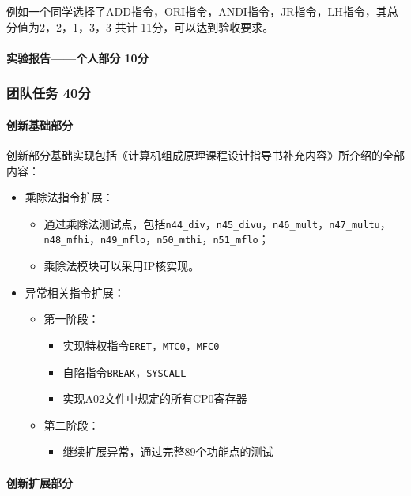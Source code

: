 例如一个同学选择了ADD指令，ORI指令，ANDI指令，JR指令，LH指令，其总分值为2，2，1，3，3 共计 11分，可以达到验收要求。

\paragraph{实验报告——个人部分 10分}

\subsubsection{团队任务 40分}

\paragraph{创新基础部分}

创新部分基础实现包括《计算机组成原理课程设计指导书补充内容》所介绍的全部内容：

\begin{itemize}
    \item 乘除法指令扩展：
    \begin{itemize}
        \item 通过乘除法测试点，包括\texttt{n44\_div}，\texttt{n45\_divu}，\texttt{n46\_mult}，\texttt{n47\_multu}，\texttt{n48\_mfhi}，\texttt{n49\_mflo}，\texttt{n50\_mthi}，\texttt{n51\_mflo}；
        \item 乘除法模块可以采用IP核实现。
    \end{itemize}
    \item 异常相关指令扩展：
    \begin{itemize}
        \item 第一阶段：
        \begin{itemize}
            \item 实现特权指令\texttt{ERET}，\texttt{MTC0}，\texttt{MFC0}
            \item 自陷指令\texttt{BREAK}，\texttt{SYSCALL}
            \item 实现A02文件中规定的所有CP0寄存器
        \end{itemize}
        \item 第二阶段：
        \begin{itemize}
            \item 继续扩展异常，通过完整89个功能点的测试
        \end{itemize}
    \end{itemize}
\end{itemize}

\paragraph{创新扩展部分}

